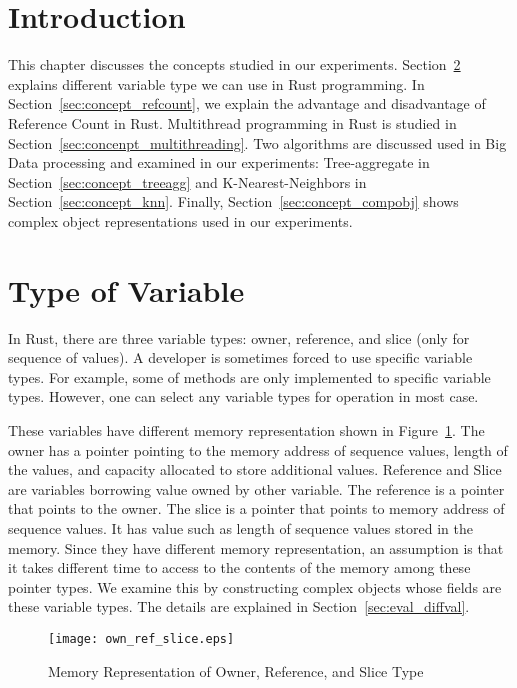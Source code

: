 \section{Introduction}
\label{sec::concept_intro}
This chapter discusses the concepts studied in our experiments. 
Section~\ref{sec:concept_diffval} explains different variable type we can use in Rust programming.
In Section~\ref{sec:concept_refcount}, we explain the advantage and disadvantage of Reference Count in Rust. 
Multithread programming in Rust is studied in Section~\ref{sec:concenpt_multithreading}. 
Two algorithms are discussed used in Big Data processing and examined in our experiments: 
Tree-aggregate in Section~\ref{sec:concept_treeagg} and K-Nearest-Neighbors in Section~\ref{sec:concept_knn}.
Finally, Section~\ref{sec:concept_compobj} shows complex object representations used in our experiments. 

\section{Type of Variable}
\label{sec:concept_diffval}
In Rust, there are three variable types: owner, reference, and slice (only for sequence of values). 
A developer is sometimes forced to use specific variable types. For example, some of methods are only implemented to specific variable types.
However, one can select any variable types for operation in most case.

These variables have different memory representation shown in Figure~\ref{fig:own_ref_slice}.
The owner has a pointer pointing to the memory address of sequence values, length of the values, and capacity allocated to store additional values. 
Reference and Slice are variables borrowing value owned by other variable. The reference is a pointer that points to the owner. 
The slice is a pointer that points to memory address of sequence values. It has value such as length of sequence values stored in the memory. 
Since they have different memory representation, an assumption is that it takes different time to access to the contents of the memory among these pointer types.
We examine this by constructing complex objects whose fields are these variable types. The details are explained in Section~\ref{sec:eval_diffval}.

\begin{figure}[htb]
    \texttt{[image: own\_ref\_slice.eps]}
    \caption{Memory Representation of Owner, Reference, and Slice Type}
    \label{fig:own_ref_slice}
\end{figure}

